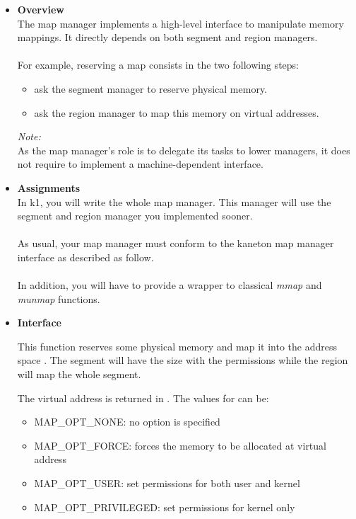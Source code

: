 \begin{itemize}
  \item {\bf Overview}\\
    The map manager implements a high-level interface to manipulate memory mappings.
    It directly depends on both segment and region managers.\\
    \\
    For example, reserving a map consists in the two following steps:
    \begin{itemize}
      \item ask the segment manager to reserve physical memory.
      \item ask the region manager to map this memory on virtual addresses.\\
    \end{itemize}

    {\em Note:}\\
    As the map manager's role is to delegate its tasks to lower managers, it does
    not require to implement a machine-dependent interface.\\

  \item {\bf Assignments}\\
    In k1, you will write the whole map manager. This manager will use the segment
    and region manager you implemented sooner.\\
    \\
    As usual, your map manager must conform to the kaneton map manager interface as
    described as follow.\\
    \\
    In addition, you will have to provide a wrapper to classical
    \emph{mmap} and \emph{munmap} functions.

  \item {\bf Interface}\\

	 {
	   This function reserves some physical memory and map it into
	   the address space .  The segment will have the
	   size  with the permissions 
	   while the region will map the whole segment.

	   The virtual address is returned in . The
	   values for  can be:
	   \begin{itemize}
	     \item {MAP\_OPT\_NONE}: no option is specified
	     \item {MAP\_OPT\_FORCE}: forces the memory to be allocated at virtual address 
	     \item {MAP\_OPT\_USER}: set permissions for both user and kernel
	     \item {MAP\_OPT\_PRIVILEGED}: set permissions for kernel only
	   \end{itemize}
	 }


\end{itemize}
